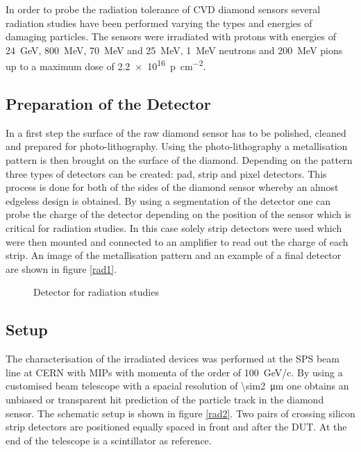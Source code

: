 In order to probe the radiation tolerance of \ac{CVD} diamond sensors several radiation studies have been performed varying the types and energies of damaging particles. The sensors were irradiated with protons with energies of \SI{24}{\giga\electronvolt}, \SI{800}{\mega\electronvolt}, \SI{70}{\mega\electronvolt} and \SI{25}{\mega\electronvolt}, \SI{1}{\mega\electronvolt} neutrons and \SI{200}{\mega\electronvolt} pions up to a maximum dose of \SI{2.2e16}{p\per\centi\meter^2}.

\subsection{Preparation of the Detector}

In a first step the surface of the raw diamond sensor has to be polished, cleaned and prepared for photo-lithography. Using the photo-lithography a metallisation pattern is then brought on the surface of the diamond. Depending on the pattern three types of detectors can be created: pad, strip and pixel detectors. This process is done for both of the sides of the diamond sensor whereby an almost edgeless design is obtained. By using a segmentation of the detector one can probe the charge of the detector depending on the position of the sensor which is critical for radiation studies. In this case solely strip detectors were used which were then mounted and connected to an amplifier to read out the charge of each strip. An image of the metallisation pattern and an example of a final detector are shown in figure \vref{rad1}.

\begin{figure}
	\centering
	\caption{Detector for radiation studies}
	\label{rad1}
\end{figure}

\subsection{Setup}

The characterisation of the irradiated devices was performed at the \ac{SPS} beam line at CERN with \acp{MIP} with momenta of the order of \SI{100}{\giga\electronvolt/c}. By using a customised beam telescope with a spacial resolution of \SI{\sim2}{\micro\meter} one obtains an unbiased or transparent hit prediction of the particle track in the diamond sensor. The schematic setup is shown in figure \vref{rad2}. Two pairs of crossing silicon strip detectors are positioned equally spaced in front and after the \ac{DUT}. At the end of the telescope is a scintillator as reference.

